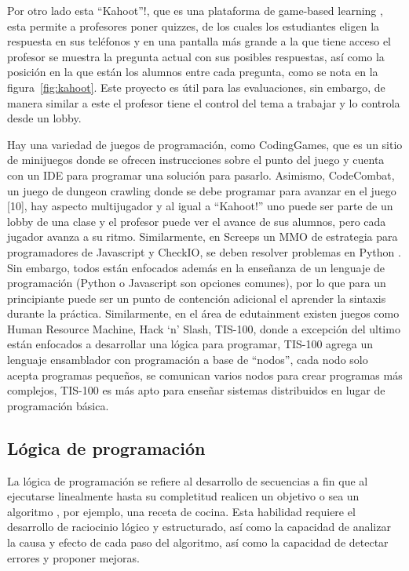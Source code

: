 Por otro lado esta “Kahoot”!, que es una plataforma de game-based learning \cite{wang2015a}, esta permite a profesores poner quizzes, de los cuales los estudiantes eligen la respuesta en sus teléfonos y en una pantalla más grande a la que tiene acceso el profesor se muestra la pregunta actual con sus posibles respuestas, así como la posición en la que están los alumnos entre cada pregunta, como se nota en la figura~\ref{fig:kahoot}. Este proyecto es útil para las evaluaciones, sin embargo, de manera similar a este el profesor tiene el control del tema a trabajar y lo controla desde un lobby. 

Hay una variedad de juegos de programación, como CodingGames, que es un sitio de minijuegos donde se ofrecen instrucciones sobre el punto del juego y cuenta con un IDE para programar una solución para pasarlo. Asimismo, CodeCombat, un juego de dungeon crawling donde se debe programar para avanzar en el juego [10], hay aspecto multijugador y al igual a “Kahoot!” uno puede ser parte de un lobby de una clase y el profesor puede ver el avance de sus alumnos, pero cada jugador avanza a su ritmo. Similarmente, en Screeps un MMO de estrategia para programadores de Javascript y CheckIO, se deben resolver problemas en Python \cite{programming_games}. Sin embargo, todos están enfocados además en la enseñanza de un lenguaje de programación (Python o Javascript son opciones comunes), por lo que para un principiante puede ser un punto de contención adicional el aprender la sintaxis durante la práctica. Similarmente, en el área de edutainment existen juegos como Human Resource Machine, Hack ‘n’ Slash, TIS-100, donde a excepción del ultimo están enfocados a desarrollar una lógica para programar, TIS-100 agrega un lenguaje ensamblador con programación a base de “nodos”, cada nodo solo acepta programas pequeños, se comunican varios nodos para crear programas más complejos, TIS-100 es más apto para enseñar sistemas distribuidos en lugar de programación básica.

\subsection{Lógica de programación}
La lógica de programación se refiere al desarrollo de secuencias a fin que al ejecutarse linealmente hasta su completitud realicen un objetivo o sea un algoritmo \cite{logica_programacion}, por ejemplo, una receta de cocina. Esta habilidad requiere el desarrollo de raciocinio lógico y estructurado, así como la capacidad de analizar la causa y efecto de cada paso del algoritmo, así como la capacidad de detectar errores y proponer mejoras.

